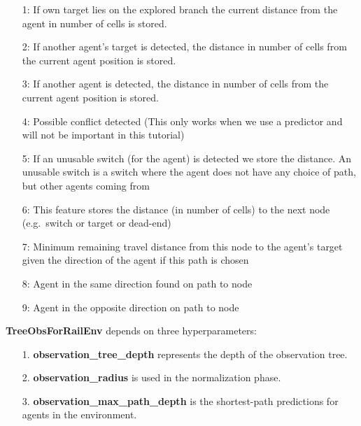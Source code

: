 \documentclass[11pt, a4paper, hidelinks]{report}
\begin{document}
\begin{enumerate}
\item [1:]If own target lies on the explored branch the current distance from the agent in number of cells is stored.
\item [2:]If another agent’s target is detected, the distance in number of cells from the current agent position is stored.
\item [3:]If another agent is detected, the distance in number of cells from the current agent position is stored.
\item [4:]Possible conflict detected (This only works when we use a predictor and will not be important in this tutorial)
\item [5:]If an unusable switch (for the agent) is detected we store the distance.
An unusable switch is a switch where the agent does not have any choice of path, but other agents coming from
\item [6:]This feature stores the distance (in number of cells) to the next node (e.g.\ switch or target or dead-end)
\item [7:]Minimum remaining travel distance from this node to the agent’s target given the direction of the agent if this path is chosen
\item [8:]Agent in the same direction found on path to node
\item [9:]Agent in the opposite direction on path to node
\end{enumerate}

\textbf{TreeObsForRailEnv} depends on three hyperparameters:

\begin{enumerate}
\item [1.] \textbf{observation\_tree\_depth} represents the depth of the observation tree.
\item [2.] \textbf{observation\_radius} is used in the normalization phase.
\item [3.] \textbf{observation\_max\_path\_depth} is the shortest-path predictions for agents in the environment.
\end{enumerate}
\end{document}
